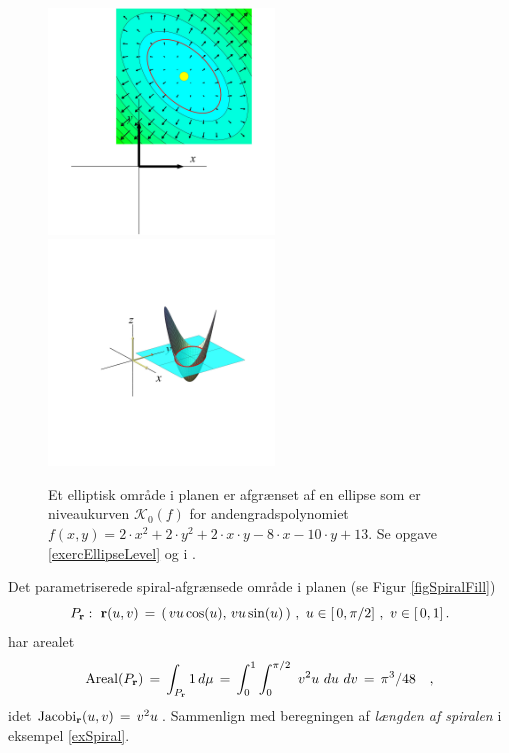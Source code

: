 \begin{figure}[ht]
\centerline{\includegraphics[height=60mm]{FIGS/plot2DGradEllip01}\includegraphics[height=60mm]{FIGS/plot2DNivEllipLift01} }
\begin{center}
\caption{\small{Et elliptisk område i planen er afgrænset af en ellipse som er niveaukurven $\mathcal{K}_{0}(f)$ for andengradspolynomiet $f(x,y) = 2\cdot x^{2} + 2\cdot y^{2} + 2\cdot x\cdot y -8\cdot x -10 \cdot y + 13$. Se opgave \ref{exercEllipseLevel}  og   i .}} \label{figEllipseLevel}
\end{center}
\end{figure}







\begin{example} \label{exSpiralFill}
Det parametriserede spiral-afgrænsede område i planen (se Figur \ref{figSpiralFill})
$$
P_{\bf r}: \,\, {\bf
r}(u, v) \, = \, \left(\, vu\cos(u), \,vu\sin(u) \, \right) \, , \, \, u \in
[\,0, \pi/2] \, \, , \, \, v \in [\,0, 1] \, .
$$
har arealet
$$
\operatorname{Areal}(P_{\bf r}) \, = \, \int_{P_{\bf r}} 1 \, d\mu \, = \,
\int_{0}^{1} \int_{0}^{\pi/2} \,\, v^{2}u \,\,du  \,\, dv \\
  \, = \,  \pi^{3}/48\quad,
$$
idet $\operatorname{Jacobi}_{\bf r}(u,v)\,= \, v^{2}u\,$. Sammenlign med beregningen af {\em{længden af spiralen}} i
eksempel \ref{exSpiral}.

\end{example}

